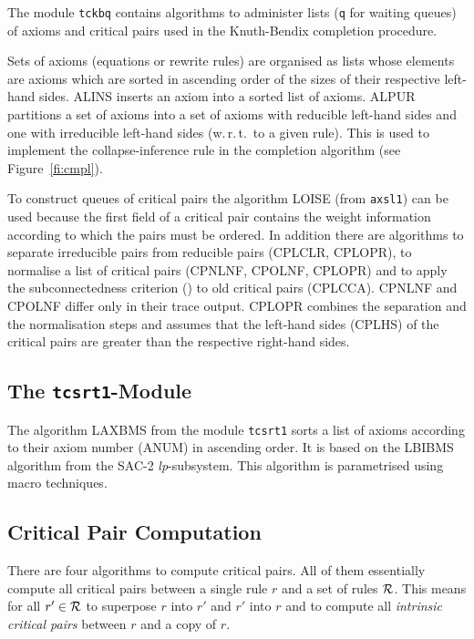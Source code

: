 The module {\tt tckbq} contains algorithms to administer lists ({\tt q} for
waiting queues) of axioms and critical pairs used in the Knuth-Bendix
completion procedure.

Sets of axioms (equations or rewrite rules) are organised as lists 
whose elements are axioms  which are sorted in ascending order of the sizes 
of their respective left-hand sides.
ALINS inserts an axiom into a sorted list of axioms.
ALPUR partitions a set of axioms into a set of axioms with reducible 
left-hand sides and one with irreducible left-hand sides (w.\,r.\,t.\ to
a given rule).
This is used to implement the collapse-inference rule in the completion
algorithm (see Figure~\ref{fi:cmpl}).

To construct queues of critical pairs the algorithm LOISE (from {\tt axsl1})
can be used because the first field of a critical pair contains the 
weight information according to which the pairs must be ordered.
In addition there are algorithms to separate irreducible pairs from
reducible pairs (CPLCLR, CPLOPR), 
to normalise a list of critical pairs (CPNLNF, CPOLNF, CPLOPR) and to apply
the subconnectedness criterion (\cite{Kuechlin:86}) to old critical pairs
(CPLCCA).
CPNLNF and CPOLNF differ only in their trace output.
CPLOPR combines the separation and the normalisation steps and assumes that
the left-hand sides (CPLHS) of the critical pairs are greater than the
respective right-hand sides.

\subsection{The {\tt tcsrt1}-Module}

The algorithm LAXBMS from the module {\tt tcsrt1} sorts a list of axioms
according to their axiom number (ANUM) in ascending order.
It is based on the LBIBMS algorithm from the SAC-2 {\it lp}-subsystem.
This algorithm is parametrised using macro techniques.

\subsection{Critical Pair Computation}

There are four algorithms to compute critical pairs.
All of them essentially compute all critical pairs between a single rule $r$ 
and a set of rules $\cal R$.
This means for all \( r' \in {\cal R} \) to superpose $r$ into $r'$ and
$r'$ into $r$ and to compute all {\em intrinsic critical pairs} between
$r$ and a copy of $r$.

